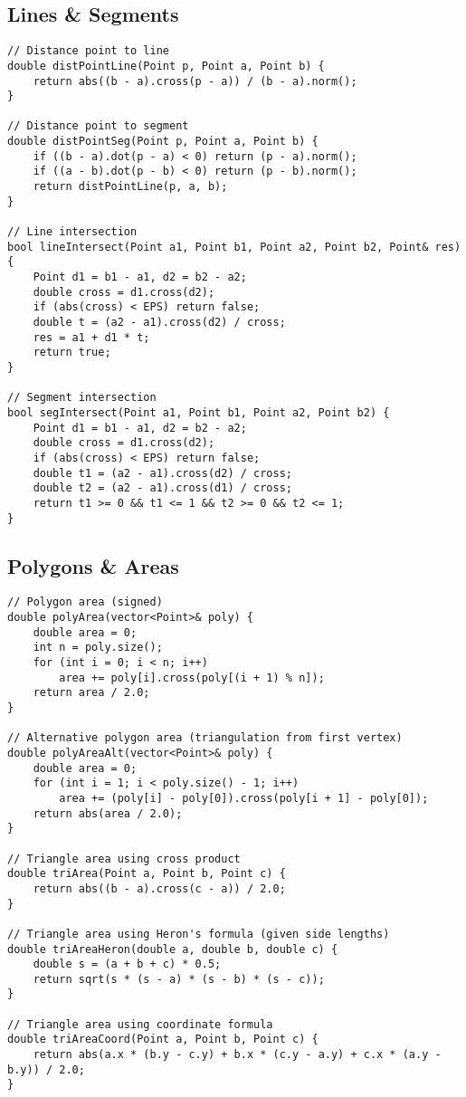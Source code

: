 \documentclass[11pt,a4paper]{article}
\begin{document}
\newpage

\subsection{Lines \& Segments}
\begin{lstlisting}[caption={Line and Segment Operations}]
// Distance point to line
double distPointLine(Point p, Point a, Point b) {
    return abs((b - a).cross(p - a)) / (b - a).norm();
}

// Distance point to segment
double distPointSeg(Point p, Point a, Point b) {
    if ((b - a).dot(p - a) < 0) return (p - a).norm();
    if ((a - b).dot(p - b) < 0) return (p - b).norm();
    return distPointLine(p, a, b);
}

// Line intersection
bool lineIntersect(Point a1, Point b1, Point a2, Point b2, Point& res) {
    Point d1 = b1 - a1, d2 = b2 - a2;
    double cross = d1.cross(d2);
    if (abs(cross) < EPS) return false;
    double t = (a2 - a1).cross(d2) / cross;
    res = a1 + d1 * t;
    return true;
}

// Segment intersection
bool segIntersect(Point a1, Point b1, Point a2, Point b2) {
    Point d1 = b1 - a1, d2 = b2 - a2;
    double cross = d1.cross(d2);
    if (abs(cross) < EPS) return false;
    double t1 = (a2 - a1).cross(d2) / cross;
    double t2 = (a2 - a1).cross(d1) / cross;
    return t1 >= 0 && t1 <= 1 && t2 >= 0 && t2 <= 1;
}
\end{lstlisting}

\newpage

\subsection{Polygons \& Areas}
\begin{lstlisting}[caption={Polygon Area Calculations}]
// Polygon area (signed)
double polyArea(vector<Point>& poly) {
    double area = 0;
    int n = poly.size();
    for (int i = 0; i < n; i++)
        area += poly[i].cross(poly[(i + 1) % n]);
    return area / 2.0;
}

// Alternative polygon area (triangulation from first vertex)
double polyAreaAlt(vector<Point>& poly) {
    double area = 0;
    for (int i = 1; i < poly.size() - 1; i++)
        area += (poly[i] - poly[0]).cross(poly[i + 1] - poly[0]);
    return abs(area / 2.0);
}

// Triangle area using cross product
double triArea(Point a, Point b, Point c) {
    return abs((b - a).cross(c - a)) / 2.0;
}

// Triangle area using Heron's formula (given side lengths)
double triAreaHeron(double a, double b, double c) {
    double s = (a + b + c) * 0.5;
    return sqrt(s * (s - a) * (s - b) * (s - c));
}

// Triangle area using coordinate formula
double triAreaCoord(Point a, Point b, Point c) {
    return abs(a.x * (b.y - c.y) + b.x * (c.y - a.y) + c.x * (a.y - b.y)) / 2.0;
}
\end{lstlisting}
\end{document}
